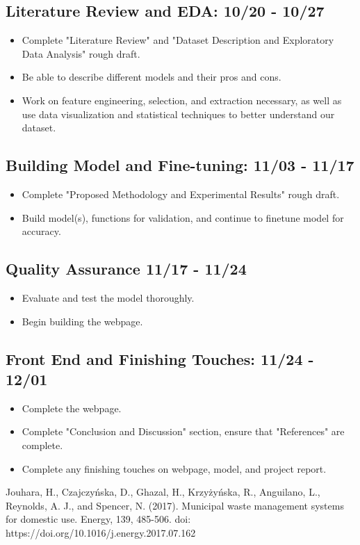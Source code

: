 \documentclass[conference]{IEEEtran}
\begin{document}
\subsection{\textbf{Literature Review and EDA: 10/20 - 10/27}}
\begin{itemize}
    \item Complete "Literature Review" and "Dataset Description and Exploratory Data Analysis" rough draft.
    \item Be able to describe different models and their pros and cons.
    \item Work on feature engineering, selection, and extraction necessary, as well as use data visualization and statistical techniques to better understand our dataset. 
\end{itemize}
\subsection{\textbf{Building Model and Fine-tuning: 11/03 - 11/17}}
\begin{itemize}
    \item Complete "Proposed Methodology and Experimental Results" rough draft.
    \item Build model(s), functions for validation, and continue to finetune model for accuracy.
\end{itemize}
\subsection{\textbf{Quality Assurance 11/17 - 11/24}}
\begin{itemize}
    \item Evaluate and test the model thoroughly. 
    \item Begin building the webpage.
\end{itemize}
\subsection{\textbf{Front End and Finishing Touches: 11/24 - 12/01}}
\begin{itemize}
    \item Complete the webpage.
    \item Complete "Conclusion and Discussion" section, ensure that "References" are complete.
    \item Complete any finishing touches on webpage, model, and project report.
\end{itemize}

\begin{thebibliography}{00}
   Jouhara, H., Czajczyńska, D., Ghazal, H., Krzyżyńska, R., Anguilano, L., Reynolds, A. J., and Spencer, N. (2017). Municipal waste management systems for domestic use. Energy, 139, 485-506. doi: https://doi.org/10.1016/j.energy.2017.07.162
\end{thebibliography}
\end{document}
